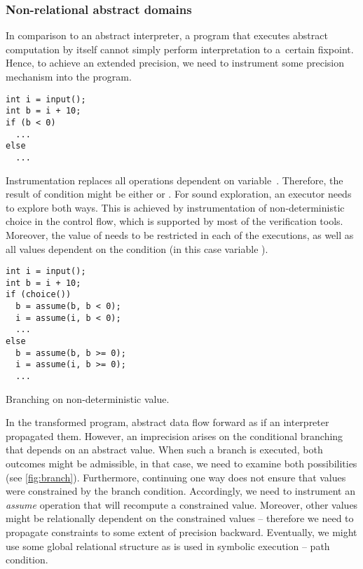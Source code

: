 \subsubsection{Non-relational abstract domains}

In comparison to an abstract interpreter, a program that executes abstract
computation by itself cannot simply perform interpretation to a~certain fixpoint. Hence,
to achieve an extended precision, we need to instrument some precision
mechanism into the program.

\begin{marginfigure}
\scriptsize

\begin{verbatim}
int i = input();
int b = i + 10;
if (b < 0)
  ...
else
  ...
\end{verbatim}

    Instrumentation replaces all ope\-ra\-tions dependent on
    variable~.  Therefore, the result of condition  might
    be either  or .  For sound exploration, an
    executor needs to explore both ways. This is achieved by instrumentation of
    non-deterministic choice in the control flow, which is supported by most of
    the verification tools. Moreover, the value of  needs to be
    restricted in each of the executions, as well as all values dependent on
    the condition (in this case variable ).

\begin{verbatim}
int i = input();
int b = i + 10;
if (choice())
  b = assume(b, b < 0);
  i = assume(i, b < 0);
  ...
else
  b = assume(b, b >= 0);
  i = assume(i, b >= 0);
  ...
\end{verbatim}

\caption{Branching on non-deterministic value.}
\label{fig:branch}
\end{marginfigure}

In the transformed program, abstract data flow forward as if an interpreter
propagated them. However, an imprecision arises on the conditional branching
that depends on an abstract value. When such a branch is executed, both
outcomes might be admissible, in that case, we need to examine both
possibilities (see \autoref{fig:branch}).
Furthermore, continuing one way does not ensure that values were constrained
by the branch condition. Accordingly, we need to instrument an
\emph{assume} operation that will recompute a constrained value. Moreover,
other values might be relationally dependent on the constrained values --
therefore we need to propagate constraints to some extent of precision
backward. Eventually, we might use some global relational structure as is used
in symbolic execution -- path condition.

